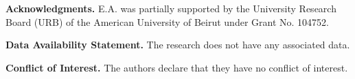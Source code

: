 \documentclass[12pt,reqno]{amsart}
\begin{document}
\vspace{0.5cm}

{\bf{Acknowledgments.}} E.A. was partially supported by the University Research Board (URB) of the American University of Beirut under Grant No. 104752. 

\vspace{0.5cm}

{\bf{Data Availability Statement.}} The research does not have any associated data.

\vspace{0.5cm}

{\bf{Conflict of Interest.}} The authors declare that they have no conflict of interest.




\end{document}
